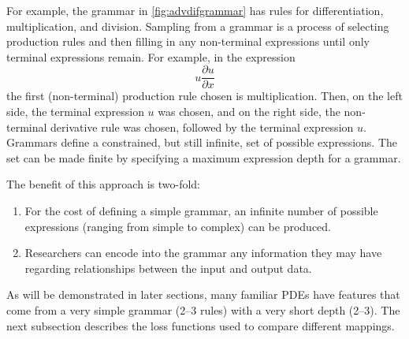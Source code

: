 \documentclass{article}
\begin{document}
For example, the grammar in \cref{fig:advdifgrammar} has rules for differentiation, multiplication, and division. Sampling from a grammar is a process of selecting production rules and then filling in any non-terminal expressions until only terminal expressions remain. For example, in the expression 
\begin{equation}
    u \frac{\partial u}{\partial x }
\end{equation}
the first (non-terminal) production rule chosen is multiplication. Then, on the left side, the terminal expression $u$ was chosen, and on the right side, the non-terminal derivative rule was chosen, followed by the terminal expression $u$. Grammars define a constrained, but still infinite, set of possible expressions. The set can be made finite by specifying a maximum expression depth for a grammar. 

The benefit of this approach is two-fold:
\begin{enumerate}
    \item For the cost of defining a simple grammar, an infinite number of possible expressions (ranging from simple to complex) can be produced.
    \item Researchers can encode into the grammar any information they may have regarding relationships between the input and output data.
\end{enumerate}
As will be demonstrated in later sections, many familiar PDEs have features that come from a very simple grammar (2--3 rules) with a very short depth (2--3). The next subsection describes the loss functions used to compare different mappings.  
\end{document}
